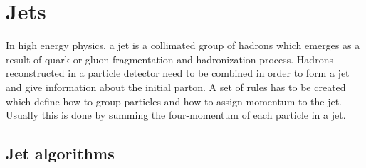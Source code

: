 
\section{Jets}

In high energy physics, a jet is a collimated group of hadrons which emerges as a result of quark or gluon fragmentation and hadronization process. Hadrons reconstructed in a particle detector need to be combined in order to form a jet and give information about the initial parton. A set of rules has to be created which define how to group particles and how to assign momentum to the jet. Usually this is done by summing the four-momentum of each particle in a jet.


\subsection{Jet algorithms}


